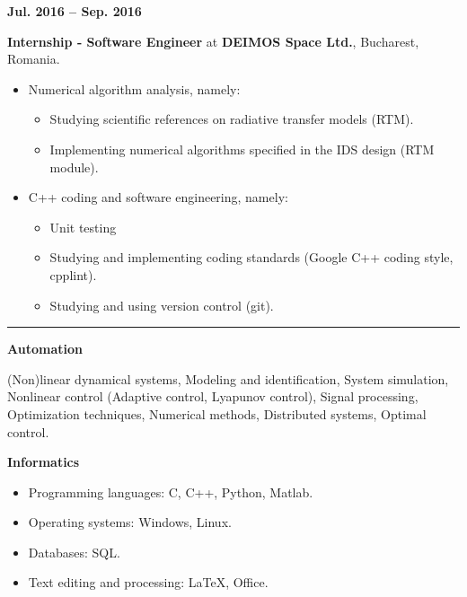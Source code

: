 \documentclass[a4paper,10pt]{article}
\newlength{\cvcolumngapwidth}
\newlength{\cvleftcolumnwidth}
\newlength{\cvrightcolumnwidth}
\newcommand{\cvsectionstyle}[1]{{\large\cvsectionfont\textcolor{cvsectioncolor}{#1}}}
\newcommand{\cvtitlestyle}[1]{{\large\cvtitlefont\textcolor{cvtitlecolor}{#1}}}
\newcommand{\cvdurationstyle}[1]{{\cvdurationfont\textcolor{cvdurationcolor}{#1}}}
\newcommand{\cvheadingstyle}[1]{{\cvheadingfont\textcolor{cvheadingcolor}{#1}}}
\newlength{\cvafteritemskipamount}
\newlength{\cvaftersectionskipamount}
\newlength{\cvbetweensectionandheadingextraskipamount}
\newlength{\cvaftertitleskipamount}
\newlength{\cvparskip}
\newcommand{\cvsection}[1]{
    \begin{minipage}[t]{\cvleftcolumnwidth}
        \raggedleft\cvsectionstyle{#1}
    \end{minipage}%
    \hspace{\cvcolumngapwidth}%
    \begin{minipage}[t]{\cvrightcolumnwidth}
        \textcolor{cvrulecolor}{\rule{\cvrightcolumnwidth}{0.3mm}}
    \end{minipage}

    \vspace{\cvaftersectionskipamount}
}
\newcommand{\cvitem}[2]{
    \begin{minipage}[t]{\cvleftcolumnwidth}
        \raggedleft #1
    \end{minipage}%
    \hspace{\cvcolumngapwidth}%
    \begin{minipage}[t]{\cvrightcolumnwidth}
        \setlength{\parskip}{\cvparskip} #2
    \end{minipage}

    \vspace{\cvafteritemskipamount}
}
\newcommand{\cvtitle}[1]{
    \cvtitlestyle{#1}

    \vspace{\cvaftertitleskipamount}
    \vspace{-\cvparskip}
}
\begin{document}
\cvitem{
    \cvdurationstyle{\textbf{Jul. 2016 -- Sep. 2016}}
}{
    \cvtitle{\textbf{Internship - Software Engineer} at \textbf{DEIMOS Space Ltd.}, Bucharest, Romania.}
    \begin{itemize}[leftmargin=*]
        \item Numerical algorithm analysis, namely:
              \begin{itemize}[leftmargin=*]
                  \item Studying scientific references on radiative transfer models (RTM).
                  \item Implementing numerical algorithms specified in the IDS design (RTM module).
              \end{itemize}
        \item C++ coding and software engineering, namely:
              \begin{itemize}[leftmargin=*]
                  \item Unit testing
                  \item Studying and implementing coding standards (Google C++ coding style, cpplint).
                  \item Studying and using version control (git).
              \end{itemize}
    \end{itemize}
}


\cvsection{Technical skills}

\vspace{\cvbetweensectionandheadingextraskipamount}

\cvitem{
    \cvheadingstyle{\textbf{Automation}}
}{

    (Non)linear dynamical systems, Modeling and identification, System simulation, Nonlinear control (Adaptive control, Lyapunov control), Signal processing, Optimization techniques, Numerical methods, Distributed systems, Optimal control.
}

\cvitem{
    \cvheadingstyle{\textbf{Informatics}}
}{

    \begin{itemize}[leftmargin=*]
        \item Programming languages: C, C++, Python, Matlab.
        \item Operating systems: Windows, Linux.
        \item Databases: SQL.
        \item Text editing and processing: \LaTeX, Office.
    \end{itemize}
}
\end{document}
